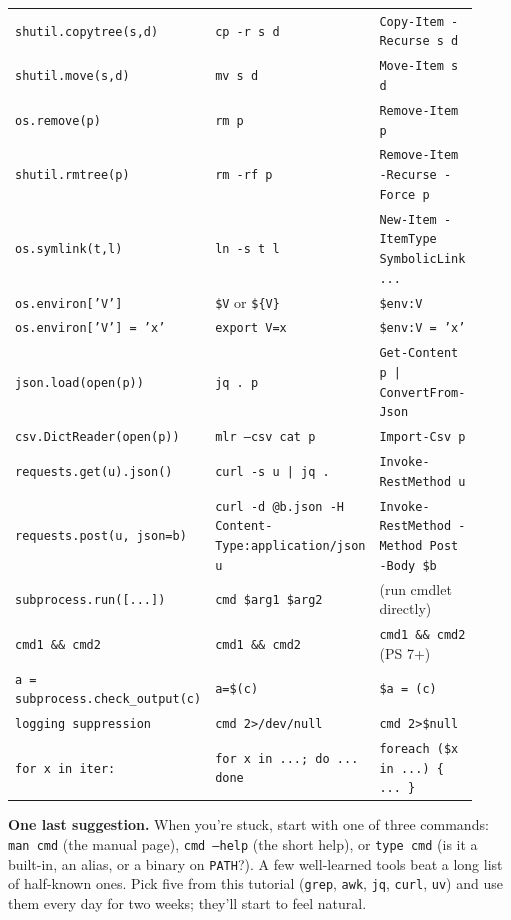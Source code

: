 \documentclass[11pt,a4paper]{article}
\newcommand{\cmd}[1]{\texttt{\textcolor{bashKw}{#1}}}
\newcommand{\pcmd}[1]{\texttt{\textcolor{pyKw}{#1}}}
\newcommand{\pscmd}[1]{\texttt{\textcolor{pwshKw}{#1}}}
\begin{document}
\begin{center}
\begin{tabular}{p{0.32\linewidth} p{0.32\linewidth} p{0.28\linewidth}}
\pcmd{shutil.copytree(s,d)}         & \cmd{cp -r s d}                    & \pscmd{Copy-Item -Recurse s d} \\
\pcmd{shutil.move(s,d)}             & \cmd{mv s d}                       & \pscmd{Move-Item s d} \\
\pcmd{os.remove(p)}                 & \cmd{rm p}                         & \pscmd{Remove-Item p} \\
\pcmd{shutil.rmtree(p)}             & \cmd{rm -rf p}                     & \pscmd{Remove-Item -Recurse -Force p} \\
\pcmd{os.symlink(t,l)}              & \cmd{ln -s t l}                    & \pscmd{New-Item -ItemType SymbolicLink ...} \\
\pcmd{os.environ['V']}              & \cmd{\$V} or \cmd{\$\{V\}}         & \pscmd{\$env:V} \\
\pcmd{os.environ['V'] = 'x'}        & \cmd{export V=x}                   & \pscmd{\$env:V = 'x'} \\
\pcmd{json.load(open(p))}           & \cmd{jq . p}                       & \pscmd{Get-Content p | ConvertFrom-Json} \\
\pcmd{csv.DictReader(open(p))}      & \cmd{mlr --csv cat p}              & \pscmd{Import-Csv p} \\
\pcmd{requests.get(u).json()}       & \cmd{curl -s u | jq .}             & \pscmd{Invoke-RestMethod u} \\
\pcmd{requests.post(u, json=b)}     & \cmd{curl -d @b.json -H Content-Type:application/json u} & \pscmd{Invoke-RestMethod -Method Post -Body \$b} \\
\pcmd{subprocess.run([...])}        & \cmd{cmd \$arg1 \$arg2}            & (run cmdlet directly) \\
\pcmd{cmd1 \&\& cmd2}               & \cmd{cmd1 \&\& cmd2}               & \cmd{cmd1 \&\& cmd2} (PS 7+) \\
\pcmd{a = subprocess.check\_output(c)}& \cmd{a=\$(c)}                    & \pscmd{\$a = (c)} \\
\pcmd{logging suppression}          & \cmd{cmd 2>/dev/null}              & \texttt{cmd 2>\$null} \\
\pcmd{for x in iter:}               & \cmd{for x in ...; do ... done}    & \pscmd{foreach (\$x in ...) \{ ... \}} \\
\bottomrule
\end{tabular}
\end{center}

\vspace{1em}
\noindent
\textbf{One last suggestion.} When you're stuck, start with one of
three commands: \cmd{man cmd} (the manual page), \cmd{cmd --help}
(the short help), or \cmd{type cmd} (is it a built-in, an alias, or
a binary on \texttt{PATH}?). A few well-learned tools beat a long
list of half-known ones. Pick five from this tutorial (\texttt{grep},
\texttt{awk}, \texttt{jq}, \texttt{curl}, \texttt{uv}) and use them
every day for two weeks; they'll start to feel natural.
\end{document}
